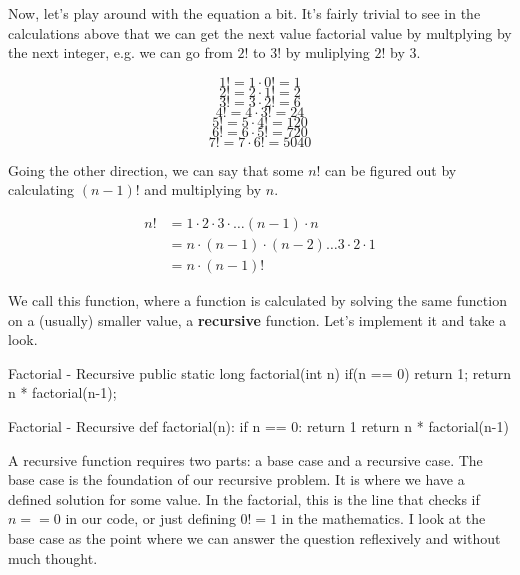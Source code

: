 Now, let's play around with the equation a bit.  It's fairly trivial to see in the calculations above that we can get the next value factorial value by multplying by the next integer, e.g. we can go from $2!$ to $3!$ by muliplying $2!$ by $3$.

$$1! = 1 \cdot 0! = 1$$
$$2! = 2 \cdot 1! = 2$$
$$3! = 3 \cdot 2! = 6$$
$$4! = 4 \cdot 3! = 24$$
$$5! = 5 \cdot 4! = 120$$
$$6! = 6 \cdot 5! = 720$$
$$7! = 7 \cdot 6! = 5040$$

Going the other direction, we can say that some $n!$ can be figured out by calculating $(n-1)!$ and multiplying by $n$. 



\begin{equation} \label{eq:fact-recus}
	\begin{split}
		n! & = 1\cdot2\cdot3\cdot\dots (n-1)\cdot n \\
		& = n \cdot (n-1) \cdot (n-2) \dots 3 \cdot 2 \cdot 1   \\
		& = n \cdot (n-1)!
	\end{split}
\end{equation}

We call this function, where a function is calculated by solving the same function on a (usually) smaller value, a \textbf{recursive} function.
Let's implement it and take a look.

\begin{javacode}[label={code:factrecurjava}]{Factorial - Recursive}
public static long factorial(int n) {
	if(n == 0) {
		return 1;
	}
	return n * factorial(n-1);
}\end{javacode}

\begin{pycode}[label={code:factrecurpy}]{Factorial - Recursive}
def factorial(n):
	if n == 0:
		return 1
	return n * factorial(n-1)\end{pycode}




A recursive function requires two parts: a base case and a recursive case.  
The base case is the foundation of our recursive problem.  
It is where we have a defined solution for some value.
In the factorial, this is the line that checks  if  $n == 0$ in our code, or just defining $0! = 1$ in the mathematics.
I look at the base case as the point where we can answer the question reflexively and without much thought.


